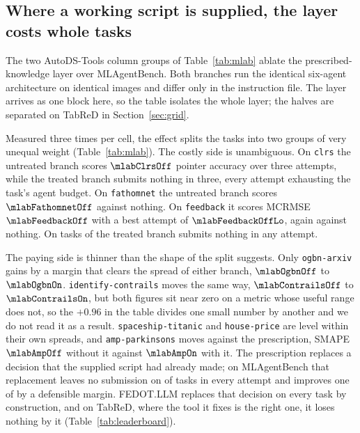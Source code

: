 \subsection{Where a working script is supplied, the layer costs whole tasks}
\label{sec:signflip}

The two AutoDS-Tools column groups of Table~\ref{tab:mlab} ablate the
prescribed-knowledge layer over MLAgentBench. Both branches run the identical six-agent architecture on
identical images and differ only in the instruction file. The layer arrives as
one block here, so the table isolates the whole layer; the halves are
separated on TabReD in Section~\ref{sec:grid}.


Measured three times per cell, the effect splits the tasks into two groups of
very unequal weight (Table~\ref{tab:mlab}). The costly side is
unambiguous. On \texttt{clrs} the untreated branch scores $\mlabClrsOff$
pointer accuracy over three attempts, while the treated branch submits nothing
in three, every attempt exhausting the task's agent budget. On
\texttt{fathomnet} the untreated branch scores $\mlabFathomnetOff$ against
nothing. On \texttt{feedback} it scores MCRMSE $\mlabFeedbackOff$ with a best
attempt of $\mlabFeedbackOffLo$, again against nothing. On \mlabWiped{} tasks of \mlabRepeated{} the treated branch submits nothing in any
attempt.

The paying side is thinner than the shape of the split suggests. Only
\texttt{ogbn-arxiv} gains by a margin that clears the spread of either branch,
$\mlabOgbnOff$ to $\mlabOgbnOn$. \texttt{identify-contrails} moves the same
way, $\mlabContrailsOff$ to $\mlabContrailsOn$, but both figures sit near zero
on a metric whose useful range does not, so the $+0.96$ in the table divides
one small number by another and we do not read it as a result.
\texttt{spaceship-titanic} and \texttt{house-price} are level within their own
spreads, and \texttt{amp-parkinsons} moves against the prescription, SMAPE
$\mlabAmpOff$ without it against $\mlabAmpOn$ with it. The prescription
replaces a decision that the supplied script had already made; on
MLAgentBench that replacement leaves no submission on \mlabWiped{} of
\mlabRepeated{} tasks in every attempt and improves one of \mlabRepeated{} by
a defensible margin. FEDOT.LLM replaces that decision on every task by
construction, and on TabReD, where the tool it fixes is the right one, it
loses nothing by it (Table~\ref{tab:leaderboard}).

